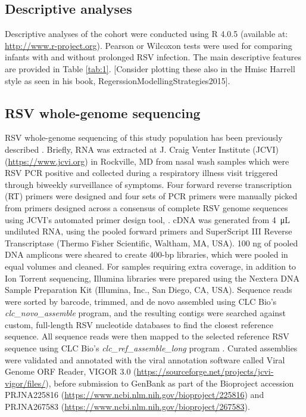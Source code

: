 \documentclass{article} %
\begin{document}
\subsection{Descriptive analyses}
Descriptive analyses of the cohort were conducted using R 4.0.5 (available at: 
\url{http://www.r-project.org}). 
Pearson or Wilcoxon tests were used for comparing infants with and without prolonged RSV infection.
The main descriptive features are provided in 
Table \ref{tab:1}.
[Consider plotting these also in the Hmisc Harrell style as seen in his book, RegerssionModellingStrategies2015].

\subsection{RSV whole-genome sequencing}
RSV whole-genome sequencing of this study population has been previously described 
\cite{schobel_respiratory_2016}.
Briefly, RNA was extracted at J. Craig Venter Institute (JCVI) (\url{https://www.jcvi.org}) in Rockville, MD from nasal wash samples which were RSV PCR positive and collected during a respiratory illness visit triggered through biweekly surveillance of symptoms. 
Four forward reverse transcription (RT) primers were designed and four sets of PCR primers were manually picked from primers designed across a consensus of complete RSV genome sequences using JCVI’s automated primer design tool,
\cite{li_automated_2012}.
cDNA was generated from \SI{4}{\micro\liter}  undiluted RNA, using the pooled forward primers and SuperScript III Reverse Transcriptase (Thermo Fisher Scientific, Waltham, MA, USA). 
100 ng of pooled DNA amplicons were sheared to create 400-bp libraries, which were pooled in equal volumes and cleaned. 
For samples requiring extra coverage, in addition to Ion Torrent sequencing, Illumina libraries were prepared using the Nextera DNA Sample Preparation Kit (Illumina, Inc., San Diego, CA, USA). 
Sequence reads were sorted by barcode, trimmed, and de novo assembled using CLC Bio's \textit{clc\_novo\_assemble} program, and the resulting contigs were searched against custom, full-length RSV nucleotide databases to find the closest reference sequence. 
All sequence reads were then mapped to the selected reference RSV sequence using CLC Bio's \textit{clc\_ref\_assemble\_long} program 
\cite{bioWhite2016}.
Curated assemblies were validated and annotated with the viral annotation software called Viral Genome ORF Reader, VIGOR 3.0 (\url{https://sourceforge.net/projects/jcvi-vigor/files/}), before submission to GenBank as part of the Bioproject accession PRJNA225816 (\url{https://www.ncbi.nlm.nih.gov/bioproject/225816})
\cite{wang_vigor_2012} 
and PRJNA267583 (\url{https://www.ncbi.nlm.nih.gov/bioproject/267583}).
\end{document}

